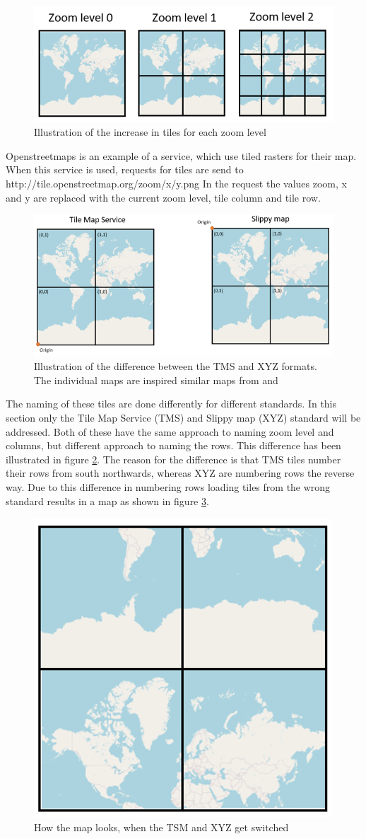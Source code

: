 \begin{figure} [H]
	\centering
	\includegraphics[width=.8\textwidth]{Pictures/TilesPerZoomLevel}
	\caption{Illustration of the increase in tiles for each zoom level}
	\label{TilesPerZoomLevel}
\end{figure}

Openstreetmaps is an example of a service, which use tiled rasters for their map. When this service is used, requests for tiles are send to 
http://tile.openstreetmap.org/zoom/x/y.png
In the request the values zoom, x and y are replaced with the current zoom level, tile column and tile row.
\citep{SlippyMap}

\begin{figure} [H]
	\centering
	\includegraphics[width=.8\textwidth]{Pictures/TMSXYZ}
	\caption{Illustration of the difference between the TMS and XYZ formats. The individual maps are inspired similar maps from \citet{Slippy101} and \citet{TMSnaming}}
	\label{TMSXYZ}
\end{figure}

% 

The naming of these tiles are done differently for different standards. In this section only the Tile Map Service (TMS) and Slippy map (XYZ) standard will be addressed. Both of these have the same approach to naming zoom level and columns, but different approach to naming the rows. This difference has been illustrated in figure \ref{TMSXYZ}. The reason for the difference is that TMS tiles number their rows from south northwards, whereas XYZ are numbering rows the reverse way. Due to this difference in numbering rows loading tiles from the wrong standard results in a map as shown in figure \ref{SlippyInTMS}.
\citep{TMS}


\begin{figure} [H]
	\centering
	\includegraphics[width=.3\textwidth]{Pictures/SlippyInTMS}
	\caption{How the map looks, when the TSM and XYZ get switched}
	\label{SlippyInTMS}
\end{figure}